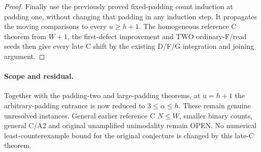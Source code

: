 \begin{proof}
Finally use the previously proved fixed-padding count induction at
padding one, without changing that padding in any induction step.
It propagates the moving comparisons to every $u\ge h+1$.
The homogeneous reference C theorem from $W+1$, the first-defect
improvement and TWO ordinary-F/read seeds then give every late C
shift by the existing D/F/G integration and joining argument.
\end{proof}

\paragraph{Scope and residual.}
Together with the padding-two and large-padding theorems, at
$u=h+1$ the arbitrary-padding entrance is now reduced to
$3\le\alpha\le h$. These remain genuine unresolved instances.
General earlier reference C $N\le W$, smaller binary counts,
general C/A2 and original unamplified unimodality remain OPEN.
No numerical least-counterexample bound for the original conjecture
is changed by this late-C theorem.
